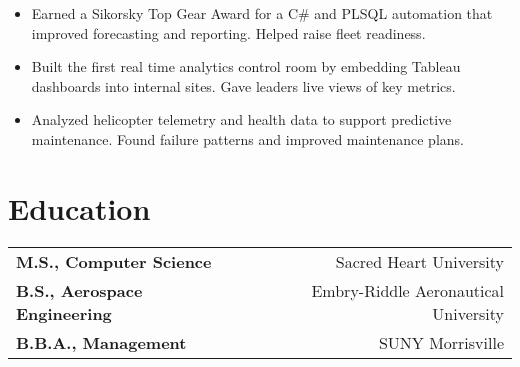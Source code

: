 \begin{itemize}[leftmargin=*]
    \item Earned a Sikorsky Top Gear Award for a C\#
    and PLSQL automation that improved forecasting and reporting. Helped raise fleet readiness.
    \item
    Built the first real time analytics control room by embedding Tableau dashboards into internal sites. Gave leaders
    live views of key metrics.
    \item
    Analyzed helicopter telemetry and health data to support predictive maintenance. Found failure patterns and improved
    maintenance plans.
\end{itemize}



\section*{Education}
\noindent
\begin{tabularx}{\textwidth}{@{}Xr@{}}
    \textbf{M.S., Computer Science} & Sacred Heart University \\
    \textbf{B.S., Aerospace Engineering} & Embry-Riddle Aeronautical University \\
    \textbf{B.B.A., Management} & SUNY Morrisville \\
\end{tabularx}
